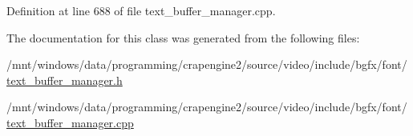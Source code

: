 Definition at line 688 of file text\+\_\+buffer\+\_\+manager.\+cpp.



The documentation for this class was generated from the following files\+:\begin{DoxyCompactItemize}
\item 
/mnt/windows/data/programming/crapengine2/source/video/include/bgfx/font/\hyperlink{text__buffer__manager_8h}{text\+\_\+buffer\+\_\+manager.\+h}\item 
/mnt/windows/data/programming/crapengine2/source/video/include/bgfx/font/\hyperlink{text__buffer__manager_8cpp}{text\+\_\+buffer\+\_\+manager.\+cpp}\end{DoxyCompactItemize}
